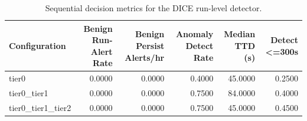 \begin{table}[t]
\centering
\caption{Sequential decision metrics for the DICE run-level detector.}
\label{tab:dice_sequential_metrics}
\footnotesize
\begin{tabular}{lrrrrr}
\toprule
Configuration & Benign Run-Alert Rate & Benign Persist Alerts/hr & Anomaly Detect Rate & Median TTD (s) & Detect <=300s \\
\midrule
tier0 & 0.0000 & 0.0000 & 0.4000 & 45.0000 & 0.2500 \\
tier0_tier1 & 0.0000 & 0.0000 & 0.7500 & 84.0000 & 0.4000 \\
tier0_tier1_tier2 & 0.0000 & 0.0000 & 0.7500 & 45.0000 & 0.4500 \\
\bottomrule
\end{tabular}

\end{table}
